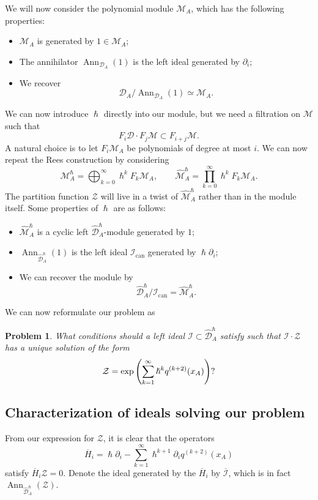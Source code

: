 \documentclass[leqno, openany]{memoir}
\newtheorem{prob}[thm]{Problem}
\theoremstyle{definition}
\theoremstyle{remark}
\theoremstyle{plain}
\theoremstyle{definition}
\theoremstyle{remark}
\newcommand{\mc}[1]{\mathcal{#1}}
\newcommand{\mr}[1]{\mathrm{#1}}
\newcommand{\on}[1]{\operatorname{#1}}
\newcommand{\ol}[1]{\overline{#1}}
\newcommand{\wh}[1]{\widehat{#1}}
\begin{document}
We will now consider the polynomial module $\mc{M}_A$, which has the following properties: 
\begin{itemize}
    \item $\mc{M}_A$ is generated by $1 \in \mc{M}_A$; 
    \item The annihilator $\on{Ann}_{\mc{D}_A}(1)$ is the left ideal generated by $\partial_i$; 
    \item We recover 
        \[ \mc{D}_A / \on{Ann}_{\mc{D}_A}(1) \simeq \mc{M}_A. \]
\end{itemize}
We can now introduce $\hslash$ directly into our module, but we need a filtration on $\mc{M}$ such that
\[ F_i \mc{D} \cdot F_j \mc{M} \subset F_{i+j} \mc{M}. \]
A natural choice is to let $F_i \mc{M}_A$ be polynomials of degree at most $i$. We can now repeat the Rees construction by considering
\[ \mc{M}_A^{\hslash} = \bigoplus_{k=0}^{\infty} \hslash^k F_k \mc{M}_A, \qquad \wh{\mc{M}}_A^{\hslash} = \prod_{k=0}^{\infty} \hslash^k F_k \mc{M}_A. \]
The partition function $\mc{Z}$ will live in a twist of $\wh{\mc{M}}_A^{\hslash}$ rather than in the module itself. Some properties of $\hslash$ are as follows:
\begin{itemize}
    \item $\wh{\mc{M}}_A^{\hslash}$ is a cyclic left $\wh{\mc{D}}_A^{\hslash}$-module generated by $1$;
    \item $\on{Ann}_{\wh{\mc{D}}_A^{\hslash}}(1)$ is the left ideal $\mc{I}_{\mr{can}}$ generated by $\hslash \partial_i$;
    \item We can recover the module by
        \[ \wh{\mc{D}}_A^{\hslash}/\mc{I}_{\mr{can}} = \wh{\mc{M}}_A^{\hslash}. \]
\end{itemize}

We can now reformulate our problem as
\begin{prob}
    What conditions should a left ideal $\mc{I} \subset \wh{\mc{D}}_A^{\hslash}$ satisfy such that $\mc{I} \cdot \mc{Z}$ has a unique solution of the form
    \[ \mc{Z} = \exp\qty(\sum_{k=1}^{\infty} \hslash^k q^{(k+2)}(x_A))? \]
\end{prob}

\subsection{Characterization of ideals solving our problem}

From our expression for $\mc{Z}$, it is clear that the operators
\[ \ol{H}_i = \hslash \partial_i - \sum_{k=1}^{\infty} \hslash^{k+1} \partial_i q^{(k+2)}(x_A) \]
satisfy $\ol{H}_i \mc{Z} = 0$. Denote the ideal generated by the $\ol{H}_i$ by $\ol{\mc{I}}$, which is in fact $\on{Ann}_{\wh{\mc{D}}_A^{\hslash}}(\mc{Z})$.
\end{document}
